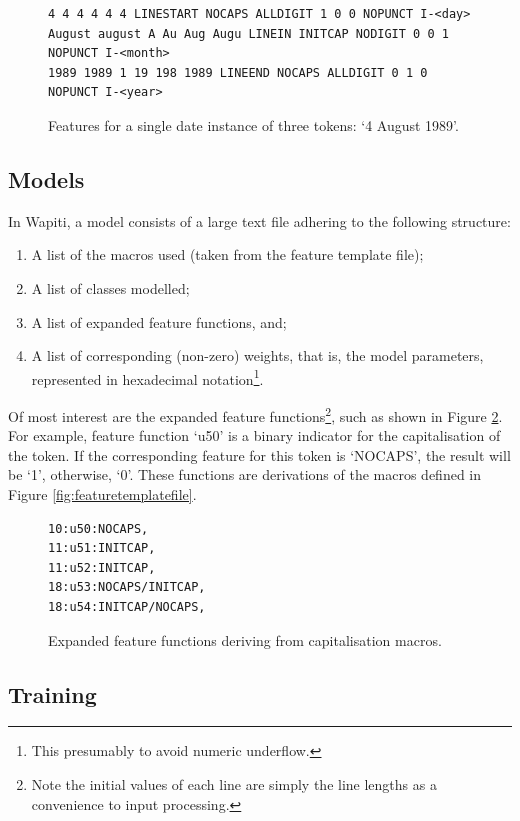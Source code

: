 \begin{figure}
\centering
\begin{BVerbatim}
4 4 4 4 4 4 LINESTART NOCAPS ALLDIGIT 1 0 0 NOPUNCT I-<day>
August august A Au Aug Augu LINEIN INITCAP NODIGIT 0 0 1 NOPUNCT I-<month>
1989 1989 1 19 198 1989 LINEEND NOCAPS ALLDIGIT 0 1 0 NOPUNCT I-<year>
\end{BVerbatim}
\caption{Features for a single date instance of three tokens: `4 August 1989'.}
\label{fig:extractedfeatures}
\end{figure}

\subsection{Models}

In Wapiti, a model consists of a large text file adhering to the following structure:

\begin{enumerate}
\item A list of the macros used (taken from the feature template file);
\item A list of classes modelled;
\item A list of expanded feature functions, and;
\item A list of corresponding (non-zero) weights, that is, the model parameters, represented in hexadecimal notation\footnote{This presumably to avoid numeric underflow.}.
\end{enumerate}

Of most interest are the expanded feature functions\footnote{Note the initial values of each line are simply the line lengths as a convenience to input processing.}, such as shown in Figure \ref{fig:expandedfeatures}. For example, feature function `u50' is a binary indicator for the capitalisation of the token. If the corresponding feature for this token is `NOCAPS', the result will be `1', otherwise, `0'. These functions are derivations of the macros defined in Figure \ref{fig:featuretemplatefile}.

\begin{figure}
\centering
\begin{BVerbatim}
10:u50:NOCAPS,
11:u51:INITCAP,
11:u52:INITCAP,
18:u53:NOCAPS/INITCAP,
18:u54:INITCAP/NOCAPS,
\end{BVerbatim}
\caption{Expanded feature functions deriving from capitalisation macros.}
\label{fig:expandedfeatures}
\end{figure}

\subsection{Training}

